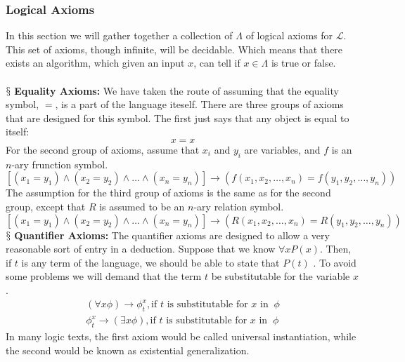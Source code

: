 \documentclass[10pt,a4paper]{article}
\newcommand{\newpoint}[1]{\indent$\mathsection$ \textbf{#1}}
\newcommand{\curveL}{\mathcal{L}}
\begin{document}
                        \subsubsection{Logical Axioms} 
                            In this section we will gather together a collection of $\Lambda$ of logical axioms for $\curveL$. This set of axioms, though infinite, will be decidable. Which means that there exists an algorithm, which given an input $x$, can tell if $x\in\Lambda$ is true or false.
                            \\
                            \\
                            \newpoint{Equality Axioms:} We have taken the route of assuming that the equality symbol, $=$, is a part of the language iteself. There are three groups of axioms that are designed for this symbol. The first just says that any object is equal to itself:
                            \begin{equation}
                                x = x
                            \end{equation}
                            For the second group of axioms, assume that $x_i$ and $y_i$ are variables, and $f$ is an $n$-ary frunction symbol.
                            \begin{equation}
                                \left[(x_1 = y_1)\land (x_2 = y_2) \land\dots\land(x_n = y_n) \right] \rightarrow \left(f(x_1,x_2,\dots,x_n) = f(y_1,y_2,\dots,y_n)\right)
                            \end{equation}
                            The assumption for the third group of axioms is the same as for the second group, except that $R$ is assumed to be an $n$-ary relation symbol.
                            \begin{equation}
                                \left[(x_1 = y_1)\land (x_2 = y_2) \land\dots\land(x_n = y_n) \right] \rightarrow \left(R(x_1,x_2,\dots,x_n) = R(y_1,y_2,\dots,y_n)\right)
                            \end{equation}
                            \newpoint{Quantifier Axioms:} The quantifier axioms are designed to allow a very reasonable sort of entry in a deduction. Suppose that we know $\forall xP(x)$. Then, if $t$ is any term of the language, we should be able to state that $P(t)$ . To avoid some problems we will demand that the term $t$ be substitutable for the variable $x$.
                            \begin{align}
                                (\forall x\phi)\rightarrow \phi_t^x, \text{if } t \text{ is substitutable for } x \text{ in } \ \phi \\
                                \phi_t^x\rightarrow (\exists x\phi), \text{if } t \text{ is substitutable for } x \text{ in } \ \phi
                            \end{align}
                            In many logic texts, the first axiom would be called universal instantiation, while the second would be known as existential generalization. 
\end{document}
